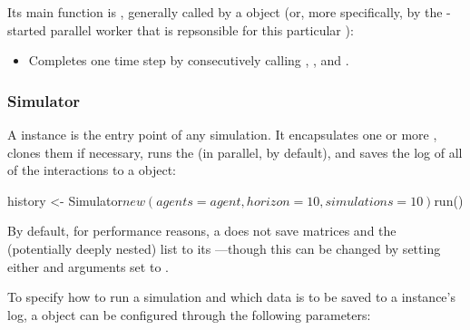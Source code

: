 \documentclass{jss}
\begin{document}
Its main function is , generally called by a  object (or, more specifically, by the -started parallel worker that is repsonsible for this particular ):

\begin{itemize}
   \item{}{
      Completes one time step  by consecutively calling
      , ,  and .
    }
\end{itemize}

\subsubsection{Simulator}

A  instance is the entry point of any  simulation. It encapsulates one or more , clones them if necessary, runs the  (in parallel, by default), and saves the log of all of the  interactions to a  object:

\begin{Code}
history <- Simulator$new(agents = agent, horizon = 10, simulations = 10)$run()
\end{Code}

By default, for performance reasons, a  does not save  matrices and the (potentially deeply nested)  list to its ---though this can be changed  by setting either  and  arguments set to .

To specify how to run a simulation and which data is to be saved to a  instance's  log, a  object can be configured through the following parameters:
\end{document}
